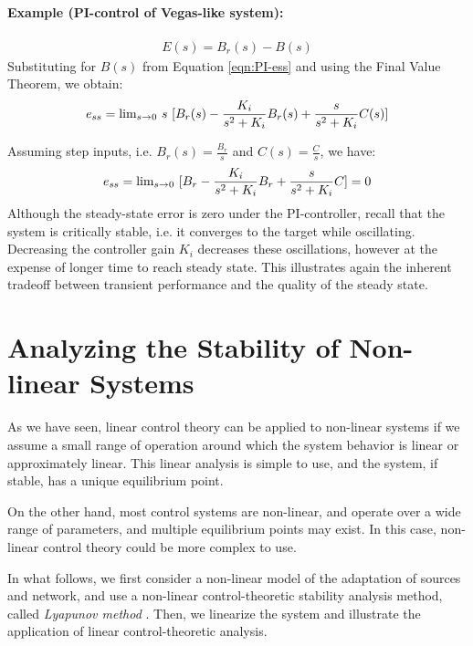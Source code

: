\documentclass{article}
\def\lm{{\rm lim}}
\begin{document}
\paragraph{Example (PI-control of Vegas-like system):}
\begin{eqnarray*}
E(s) = B_r(s) - B(s)
\end{eqnarray*}
Substituting for $B(s)$ from Equation \ref{eqn:PI-ess} and using the Final Value Theorem, we obtain:
\begin{eqnarray*}
e_{ss} = \lm_{s \rightarrow 0}\ s\ [B_r(s) - \frac{K_i}{s^2 + K_i} B_r(s) + \frac{s}{s^2 + K_i} C(s)]
\end{eqnarray*}

Assuming step inputs, i.e. $B_r(s) = \frac{B_r}{s}$ and $C(s) = \frac{C}{s}$, we have:
\begin{eqnarray*}
e_{ss} = \lm_{s \rightarrow 0}\ [B_r - \frac{K_i}{s^2 + K_i} B_r + \frac{s}{s^2 + K_i} C] = 0
\end{eqnarray*}
Although the steady-state error is zero under the PI-controller, 
recall that the system is critically stable, i.e. it converges to the target while
oscillating. Decreasing the controller gain $K_i$ decreases these oscillations,
however at the expense of longer time to reach steady state.
This illustrates again the inherent tradeoff between transient performance
and the quality of the steady state.


\section{Analyzing the Stability of Non-linear Systems}
\label{sec:nonlinear}

As we have seen, linear control theory can be applied to non-linear systems if we assume
a small range of operation around which the system behavior is linear
or approximately linear. This linear analysis
is simple to use, and the system, if stable, has a unique equilibrium point. 

On the other hand, most control systems are non-linear, and operate over a wide range of
parameters, and multiple equilibrium points may exist. In this case, non-linear control theory 
could be more complex to use.

In what follows, we first consider a non-linear model of the adaptation of sources and network,
and use a non-linear control-theoretic stability analysis method, 
called {\em Lyapunov method} \cite{Ogata:2010}.
Then, we linearize the system and illustrate the application of linear control-theoretic analysis.
\end{document}
